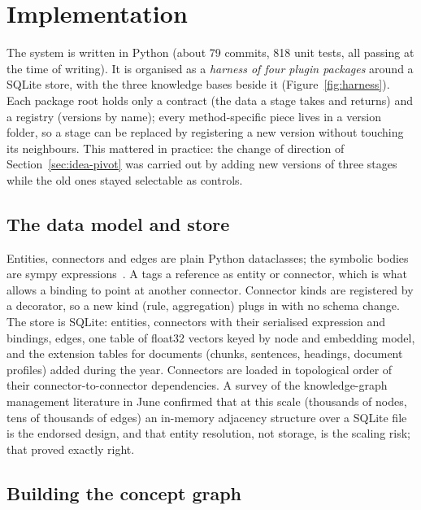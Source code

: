 \section{Implementation}
\label{sec:impl}

The system is written in Python (about 79 commits, 818 unit tests, all passing at the time of writing). It is organised as a \emph{harness of four plugin packages} around a SQLite store, with the three knowledge bases beside it (Figure~\ref{fig:harness}). Each package root holds only a contract (the data a stage takes and returns) and a registry (versions by name); every method-specific piece lives in a version folder, so a stage can be replaced by registering a new version without touching its neighbours. This mattered in practice: the change of direction of Section~\ref{sec:idea-pivot} was carried out by adding new versions of three stages while the old ones stayed selectable as controls.



\subsection{The data model and store}
\label{sec:impl-model}

Entities, connectors and edges are plain Python dataclasses; the symbolic bodies are sympy expressions~\citep{meurer2017sympy}. A  tags a reference as entity or connector, which is what allows a binding to point at another connector. Connector kinds are registered by a decorator, so a new kind (rule, aggregation) plugs in with no schema change. The store is SQLite: entities, connectors with their serialised expression and bindings, edges, one table of float32 vectors keyed by node and embedding model, and the extension tables for documents (chunks, sentences, headings, document profiles) added during the year. Connectors are loaded in topological order of their connector-to-connector dependencies. A survey of the knowledge-graph management literature in June confirmed that at this scale (thousands of nodes, tens of thousands of edges) an in-memory adjacency structure over a SQLite file is the endorsed design, and that entity resolution, not storage, is the scaling risk; that proved exactly right.

\subsection{Building the concept graph}
\label{sec:impl-concept}


